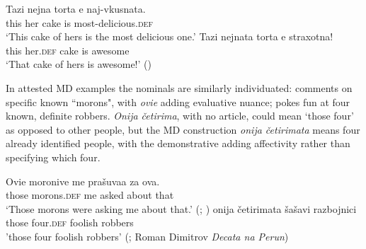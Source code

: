 \documentclass[output=paper]{langscibook}
\begin{document}
\ea
\ea \label{torta}
\gll Tazi nejna torta e 	naj-vkusnata.\\
this 	 her    cake is 	most-delicious.\textsc{def} \\
\glt‘This cake of hers is the most delicious one.’
\ex \label{tortata}
\gll Tazi nejnata torta e 	straxotna!\\
this   her.\textsc{def}  cake is 	awesome\\
\glt‘That cake of hers is awesome!’ \hfill()
\z\z

\noindent In attested MD examples the nominals are similarly individuated:  comments on specific known ``morons", with \textit{ovie} adding evaluative nuance;  pokes fun at four known, definite robbers. \textit{Onija četirima}, with no article, could mean `those four' as opposed to other people, but the MD construction \textit{onija četirimata} means four already identified people, with the demonstrative adding affectivity rather than specifying which four.

\ea \label{morons}
\gll Ovie 	moronive me	prašuvaa za	ova.\\
	those 	morons.\textsc{def}	me	asked	about 	that \\
\glt‘Those morons were asking me about that.’ \hfill(; \citealt{Prizma2015})
\z
\ea \label{four}
\gll onija 	četirimata šašavi razbojnici\\
those 	four.\textsc{def}	foolish robbers \\
\glt'those four foolish robbers' \hfill(; Roman Dimitrov \textit{Decata na Perun})
\z
\end{document}
